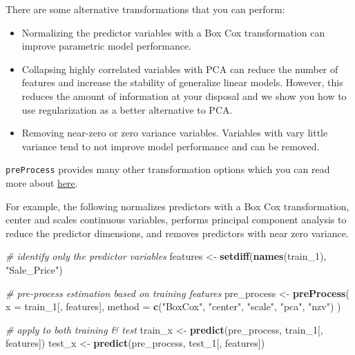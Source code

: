 \documentclass[]{book}
\newenvironment{Shaded}{\begin{snugshade}}{\end{snugshade}}
\newcommand{\CommentTok}[1]{\textcolor[rgb]{0.56,0.35,0.01}{\textit{#1}}}
\newcommand{\DataTypeTok}[1]{\textcolor[rgb]{0.13,0.29,0.53}{#1}}
\newcommand{\DecValTok}[1]{\textcolor[rgb]{0.00,0.00,0.81}{#1}}
\newcommand{\KeywordTok}[1]{\textcolor[rgb]{0.13,0.29,0.53}{\textbf{#1}}}
\newcommand{\NormalTok}[1]{#1}
\newcommand{\StringTok}[1]{\textcolor[rgb]{0.31,0.60,0.02}{#1}}
\theoremstyle{definition}
\theoremstyle{definition}
\theoremstyle{definition}
\theoremstyle{remark}
\begin{document}
There are some alternative transformations that you can perform:

\begin{itemize}
\item
  Normalizing the predictor variables with a Box Cox transformation can
  improve parametric model performance.
\item
  Collapsing highly correlated variables with PCA can reduce the number
  of features and increase the stability of generalize linear models.
  However, this reduces the amount of information at your disposal and
  we show you how to use regularization as a better alternative to PCA.
\item
  Removing near-zero or zero variance variables. Variables with vary
  little variance tend to not improve model performance and can be
  removed.
\end{itemize}

\begin{tip}
\texttt{preProcess} provides many other transformation options which you
can read more about
\href{https://topepo.github.io/caret/pre-processing.html}{here}.
\end{tip}

For example, the following normalizes predictors with a Box Cox
transformation, center and scales continuous variables, performs
principal component analysis to reduce the predictor dimensions, and
removes predictors with near zero variance.

\begin{Shaded}
\begin{Highlighting}[]
\CommentTok{# identify only the predictor variables}
\NormalTok{features <-}\StringTok{ }\KeywordTok{setdiff}\NormalTok{(}\KeywordTok{names}\NormalTok{(train_}\DecValTok{1}\NormalTok{), }\StringTok{"Sale_Price"}\NormalTok{)}

\CommentTok{# pre-process estimation based on training features}
\NormalTok{pre_process <-}\StringTok{ }\KeywordTok{preProcess}\NormalTok{(}
  \DataTypeTok{x      =}\NormalTok{ train_}\DecValTok{1}\NormalTok{[, features],}
  \DataTypeTok{method =} \KeywordTok{c}\NormalTok{(}\StringTok{"BoxCox"}\NormalTok{, }\StringTok{"center"}\NormalTok{, }\StringTok{"scale"}\NormalTok{, }\StringTok{"pca"}\NormalTok{, }\StringTok{"nzv"}\NormalTok{)    }
\NormalTok{  )}

\CommentTok{# apply to both training & test}
\NormalTok{train_x <-}\StringTok{ }\KeywordTok{predict}\NormalTok{(pre_process, train_}\DecValTok{1}\NormalTok{[, features])}
\NormalTok{test_x  <-}\StringTok{ }\KeywordTok{predict}\NormalTok{(pre_process, test_}\DecValTok{1}\NormalTok{[, features])}
\end{Highlighting}
\end{Shaded}
\end{document}

